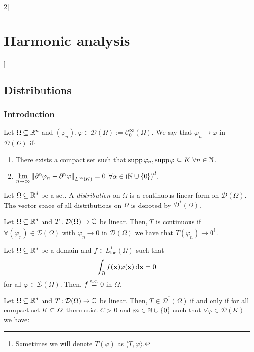 \documentclass[../../../main_math.tex]{subfiles}
\begin{document}
\begin{multicols}{2}[\section{Harmonic analysis}]
  \subsection{Distributions}
  \subsubsection{Introduction}
  \begin{definition}
    Let $\Omega\subseteq \mathbb{R}^n$ and $(\varphi_n),\varphi\in\mathcal{D}(\Omega):=\mathcal{C}_0^\infty(\Omega)$. We say that $\varphi_n\rightarrow \varphi$ in $\mathcal{D}(\Omega)$ if:
    \begin{enumerate}
      \item There exists a compact set such that $\operatorname{supp} \varphi_n,\operatorname{supp} \varphi\subseteq K$ $\forall n\in\mathbb{N}$.
      \item $\displaystyle\lim_{n\to\infty}\left\|\partial^\alpha\varphi_n-\partial^\alpha\varphi\right\|_{L^\infty(K)}=0$ $\forall \alpha\in{(\ensuremath{\mathbb{N}}\cup\{0\})}^d$.
    \end{enumerate}
  \end{definition}
  \begin{definition}[Distribution]
    Let $\Omega\subseteq \mathbb{R}^d$ be a set. A \emph{distribution} on $\Omega$ is a continuous linear form on $\mathcal{D}(\Omega)$. The vector space of all distributions on $\Omega$ is denoted by $\mathcal{D}^*(\Omega)$.
  \end{definition}
  \begin{lemma}
    Let $\Omega\subseteq\mathbb{R}^d$ and $T:\mathcal{D}(\Omega)\rightarrow\mathbb{C}$ be linear. Then, $T$ is continuous if $\forall (\varphi_n)\in\mathcal{D}(\Omega)$ with $\varphi_n\rightarrow 0$ in $\mathcal{D}(\Omega)$ we have that $T(\varphi_n)\rightarrow 0$\footnote{Sometimes we will denote $T(\varphi)$ as $\langle T,\varphi\rangle$.}.
  \end{lemma}
  \begin{lemma}\label{HA:fundamentallemma}
    Let $\Omega\subseteq\mathbb{R}^d$ be a domain and $f\in L_\mathrm{loc}^1(\Omega)$ such that $$\int_\Omega f(\boldsymbol{\mathrm{x}})\varphi(\boldsymbol{\mathrm{x}})\dd{\boldsymbol{\mathrm{x}}}=0$$ for all $\varphi\in\mathcal{D}(\Omega)$. Then, $f\overset{\text{a.e.}}{=}0$ in $\Omega$.
  \end{lemma}
  \begin{proposition}
    Let $\Omega\subseteq\mathbb{R}^d$ and $T:\mathcal{D}(\Omega)\rightarrow\mathbb{C}$ be linear. Then, $T\in \mathcal{D}^*(\Omega)$ if and only if for all compact set $K\subseteq \Omega$, there exist $C>0$ and $m\in\mathbb{N}\cup\{0\}$ such that $\forall \varphi\in\mathcal{D}(K)$ we have:

\end{proposition}
\end{multicols}
\end{document}

